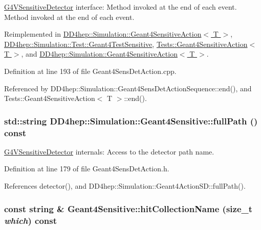 \hyperlink{class_g4_v_sensitive_detector}{G4VSensitiveDetector} interface: Method invoked at the end of each event. Method invoked at the end of each event. 

Reimplemented in \hyperlink{class_d_d4hep_1_1_simulation_1_1_geant4_sensitive_action_a144120acdde58a966bd627c572ca191d}{DD4hep::Simulation::Geant4SensitiveAction$<$ T $>$}, \hyperlink{class_d_d4hep_1_1_simulation_1_1_test_1_1_geant4_test_sensitive_accc5a2ae9369d9847ac25a01b55e6350}{DD4hep::Simulation::Test::Geant4TestSensitive}, \hyperlink{class_tests_1_1_geant4_sensitive_action_aeeb492550f054b8dd9f4780601fc1d66}{Tests::Geant4SensitiveAction$<$ T $>$}, and \hyperlink{class_d_d4hep_1_1_simulation_1_1_geant4_sensitive_action_a09d62eb1a5e2511537b371585e3f60a5}{DD4hep::Simulation::Geant4SensitiveAction$<$ T $>$}.

Definition at line 193 of file Geant4SensDetAction.cpp.

Referenced by DD4hep::Simulation::Geant4SensDetActionSequence::end(), and Tests::Geant4SensitiveAction$<$ T $>$::end().\hypertarget{class_d_d4hep_1_1_simulation_1_1_geant4_sensitive_a86cc8105ff6b9f80e3a4dfce385d3cd8}{
\subsubsection[{fullPath}]{\setlength{\rightskip}{0pt plus 5cm}std::string DD4hep::Simulation::Geant4Sensitive::fullPath () const}}
\label{class_d_d4hep_1_1_simulation_1_1_geant4_sensitive_a86cc8105ff6b9f80e3a4dfce385d3cd8}


\hyperlink{class_g4_v_sensitive_detector}{G4VSensitiveDetector} internals: Access to the detector path name. 

Definition at line 179 of file Geant4SensDetAction.h.

References detector(), and DD4hep::Simulation::Geant4ActionSD::fullPath().\hypertarget{class_d_d4hep_1_1_simulation_1_1_geant4_sensitive_a8ec3aae450bedadc6b66a2f9fde69a6b}{
\subsubsection[{hitCollectionName}]{\setlength{\rightskip}{0pt plus 5cm}const {\bf string} \& Geant4Sensitive::hitCollectionName (size\_\-t {\em which}) const}}
\label{class_d_d4hep_1_1_simulation_1_1_geant4_sensitive_a8ec3aae450bedadc6b66a2f9fde69a6b}


